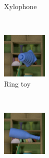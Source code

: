 \documentclass{jov}
\begin{document}
\begin{figure}[h]
\begin{subfigure}[b]{0.14 \textwidth}
        \caption{Xylophone}
        \label{fig:libraryWithXylophone}
    \end{subfigure}
    ~
	\begin{subfigure}[b]{0.14 \textwidth}
        \includegraphics[width=\textwidth]{../Figures/Figure4/Figure4_e.png}
        \caption{Ring toy}
        \label{fig:libraryWithRingToy}
    \end{subfigure}
        ~
    	\begin{subfigure}[b]{0.14 \textwidth}
        \includegraphics[width=\textwidth]{../Figures/Figure4/Figure4_f.png}

\end{subfigure}
\end{figure}
\end{document}
